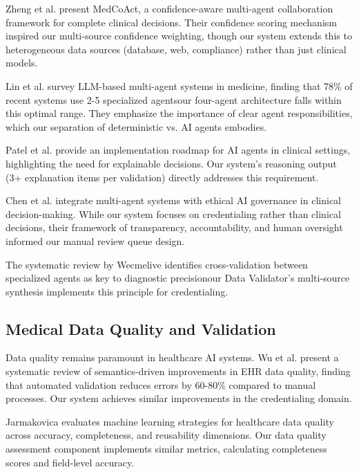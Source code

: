 \documentclass[conference]{IEEEtran}
\begin{document}
Zheng et al. \cite{zheng2025medcoact} present MedCoAct, a confidence-aware multi-agent collaboration framework for complete clinical decisions. Their confidence scoring mechanism inspired our multi-source confidence weighting, though our system extends this to heterogeneous data sources (database, web, compliance) rather than just clinical models.

Lin et al. \cite{lin2025survey} survey LLM-based multi-agent systems in medicine, finding that 78\% of recent systems use 2-5 specialized agentsour four-agent architecture falls within this optimal range. They emphasize the importance of clear agent responsibilities, which our separation of deterministic vs. AI agents embodies.

Patel et al. \cite{patel2025aiagents} provide an implementation roadmap for AI agents in clinical settings, highlighting the need for explainable decisions. Our system's reasoning output (3+ explanation items per validation) directly addresses this requirement.

Chen et al. \cite{chen2025ethical} integrate multi-agent systems with ethical AI governance in clinical decision-making. While our system focuses on credentialing rather than clinical decisions, their framework of transparency, accountability, and human oversight informed our manual review queue design.

The systematic review by Wecmelive \cite{wecmelive2024mas} identifies cross-validation between specialized agents as key to diagnostic precisionour Data Validator's multi-source synthesis implements this principle for credentialing.

\subsection{Medical Data Quality and Validation}

Data quality remains paramount in healthcare AI systems. Wu et al. \cite{wu2025semantics} present a systematic review of semantics-driven improvements in EHR data quality, finding that automated validation reduces errors by 60-80\% compared to manual processes. Our system achieves similar improvements in the credentialing domain.

Jarmakovica \cite{jarmakovica2025mlstrategies} evaluates machine learning strategies for healthcare data quality across accuracy, completeness, and reusability dimensions. Our data quality assessment component implements similar metrics, calculating completeness scores and field-level accuracy.
\end{document}
